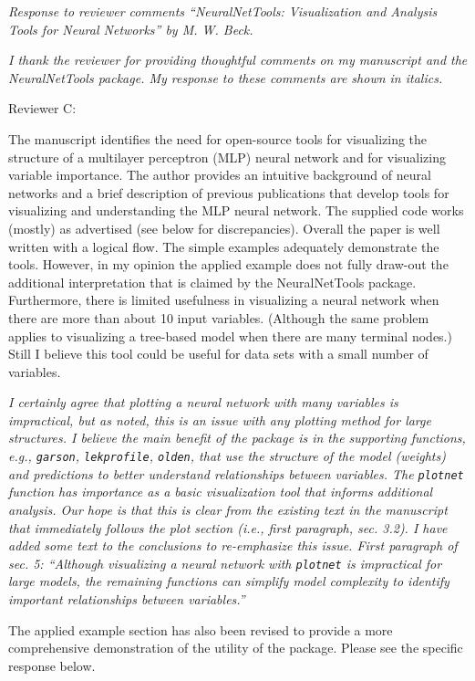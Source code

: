 \documentclass[letterpaper,12pt]{article}
\begin{document}

\raggedright


{\it Response to reviewer comments ``NeuralNetTools: Visualization and Analysis Tools for Neural Networks'' by M. W. Beck.}

{\it I thank the reviewer for providing thoughtful comments on my manuscript and the NeuralNetTools package.  My response to these comments are shown in italics.}

Reviewer C:

The manuscript identifies the need for open-source tools for visualizing the structure of a multilayer perceptron (MLP) neural network and for visualizing variable importance.  The author provides an intuitive background of neural networks and a brief description of previous publications that develop tools for visualizing and understanding the MLP neural network.  The supplied code works (mostly) as advertised (see below for discrepancies).  Overall the paper is well written with a logical flow.  The simple examples adequately demonstrate the tools.  However, in my opinion the applied example does not fully draw-out the additional interpretation that is claimed by the NeuralNetTools package.  Furthermore, there is limited usefulness in visualizing a neural network when there are more than about 10 input variables.  (Although the same problem applies to visualizing a tree-based model when there are many terminal nodes.)  Still I believe this tool could be useful for data sets with a small number of variables.

{\it I certainly agree that plotting a neural network with many variables is impractical, but as noted, this is an issue with any plotting method for large structures.  I believe the main benefit of the package is in the supporting functions, e.g., \texttt{garson}, \texttt{lekprofile}, \texttt{olden}, that use the structure of the model (weights) and predictions to better understand relationships between variables. The \texttt{plotnet} function has importance as a basic visualization tool that informs additional analysis. Our hope is that this is clear from the existing text in the manuscript that immediately follows the plot section (i.e., first paragraph, sec. 3.2).  I have added some text to the conclusions to re-emphasize this issue. First paragraph of sec. 5: ``Although visualizing a neural network with \texttt{plotnet} is impractical for large models, the remaining functions can simplify model complexity to identify important relationships between variables.''

The applied example section has also been revised to provide a more comprehensive demonstration of the utility of the package.  Please see the specific response below.
}
\end{document}
